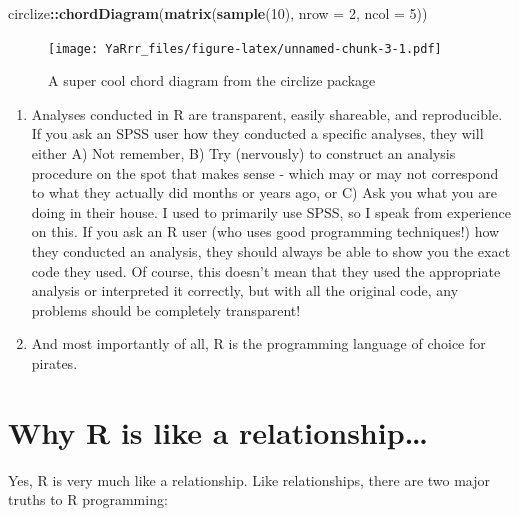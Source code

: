 \documentclass[]{book}
\newenvironment{Shaded}{\begin{snugshade}}{\end{snugshade}}
\newcommand{\KeywordTok}[1]{\textcolor[rgb]{0.13,0.29,0.53}{\textbf{#1}}}
\newcommand{\DataTypeTok}[1]{\textcolor[rgb]{0.13,0.29,0.53}{#1}}
\newcommand{\DecValTok}[1]{\textcolor[rgb]{0.00,0.00,0.81}{#1}}
\newcommand{\OperatorTok}[1]{\textcolor[rgb]{0.81,0.36,0.00}{\textbf{#1}}}
\newcommand{\NormalTok}[1]{#1}
\theoremstyle{definition}
\theoremstyle{definition}
\theoremstyle{remark}
\begin{document}
\begin{Shaded}
\begin{Highlighting}[]
\NormalTok{circlize}\OperatorTok{::}\KeywordTok{chordDiagram}\NormalTok{(}\KeywordTok{matrix}\NormalTok{(}\KeywordTok{sample}\NormalTok{(}\DecValTok{10}\NormalTok{), }
                              \DataTypeTok{nrow =} \DecValTok{2}\NormalTok{, }\DataTypeTok{ncol =} \DecValTok{5}\NormalTok{))}
\end{Highlighting}
\end{Shaded}

\begin{figure}
\centering
\texttt{[image: YaRrr\_files/figure-latex/unnamed-chunk-3-1.pdf]}
\caption{\label{fig:unnamed-chunk-3}A super cool chord diagram from the
circlize package}
\end{figure}

\begin{enumerate}
\def\labelenumi{\arabic{enumi}.}
\setcounter{enumi}{4}
\item
  Analyses conducted in R are transparent, easily shareable, and
  reproducible. If you ask an SPSS user how they conducted a specific
  analyses, they will either A) Not remember, B) Try (nervously) to
  construct an analysis procedure on the spot that makes sense - which
  may or may not correspond to what they actually did months or years
  ago, or C) Ask you what you are doing in their house. I used to
  primarily use SPSS, so I speak from experience on this. If you ask an
  R user (who uses good programming techniques!) how they conducted an
  analysis, they should always be able to show you the exact code they
  used. Of course, this doesn't mean that they used the appropriate
  analysis or interpreted it correctly, but with all the original code,
  any problems should be completely transparent!
\item
  And most importantly of all, R is the programming language of choice
  for pirates.
\end{enumerate}

\hypertarget{rrelationship}{\section{Why R is like a
relationship\ldots{}}\label{rrelationship}}

Yes, R is very much like a relationship. Like relationships, there are
two major truths to R programming:
\end{document}
